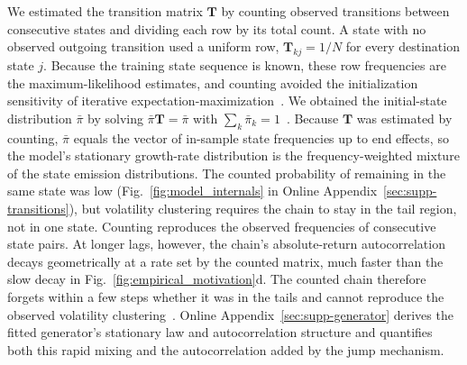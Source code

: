 We estimated the transition matrix $\mathbf{T}$ by counting observed
transitions between consecutive states and dividing each row by its
total count. A state with no observed outgoing transition used a
uniform row, $\mathbf{T}_{kj}=1/N$ for every destination state $j$.
Because the training state sequence is known, these row frequencies
are the maximum-likelihood estimates, and counting avoided the
initialization sensitivity of iterative
expectation-maximization~\cite{bilmes1998}. We obtained the
initial-state distribution $\bar{\pi}$ by solving
$\bar{\pi}\mathbf{T}=\bar{\pi}$ with
$\sum_k\bar{\pi}_k=1$~\cite{hamilton2018regime, grinsteadSnell1997}.
Because $\mathbf{T}$ was estimated by counting, $\bar{\pi}$ equals
the vector of in-sample state frequencies up to end effects, so the
model's stationary growth-rate distribution is the
frequency-weighted mixture of the state emission distributions. The counted probability of remaining in the same state was low
(Fig.~\ref{fig:model_internals} in Online
Appendix~\ref{sec:supp-transitions}), but volatility clustering
requires the chain to stay in the tail region, not in one state. Counting reproduces the observed
frequencies of consecutive state pairs. At longer lags, however, the
chain's absolute-return autocorrelation decays geometrically at a rate
set by the counted matrix, much faster than the slow decay in
Fig.~\ref{fig:empirical_motivation}d. The counted chain therefore
forgets within a few steps whether it was in the tails and cannot
reproduce the observed volatility clustering~\cite{bullaBulla2006}. Online
Appendix~\ref{sec:supp-generator} derives the fitted generator's
stationary law and autocorrelation structure and quantifies both this
rapid mixing and the autocorrelation added by the jump mechanism.

